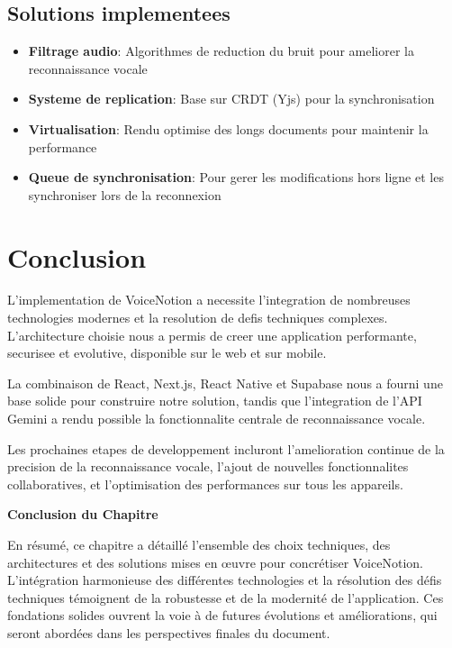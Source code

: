 \subsection{Solutions implementees}
\begin{itemize}
    \item \textbf{Filtrage audio}: Algorithmes de reduction du bruit pour ameliorer la reconnaissance vocale
    \item \textbf{Systeme de replication}: Base sur CRDT (Yjs) pour la synchronisation
    \item \textbf{Virtualisation}: Rendu optimise des longs documents pour maintenir la performance
    \item \textbf{Queue de synchronisation}: Pour gerer les modifications hors ligne et les synchroniser lors de la reconnexion
\end{itemize}



\section{Conclusion}
L'implementation de VoiceNotion a necessite l'integration de nombreuses technologies modernes et la resolution de defis techniques complexes. L'architecture choisie nous a permis de creer une application performante, securisee et evolutive, disponible sur le web et sur mobile.

La combinaison de React, Next.js, React Native et Supabase nous a fourni une base solide pour construire notre solution, tandis que l'integration de l'API Gemini a rendu possible la fonctionnalite centrale de reconnaissance vocale.

Les prochaines etapes de developpement incluront l'amelioration continue de la precision de la reconnaissance vocale, l'ajout de nouvelles fonctionnalites collaboratives, et l'optimisation des performances sur tous les appareils. 

\vspace{1cm}
\begin{center}
\textbf{\large Conclusion du Chapitre}
\end{center}

\noindent
En résumé, ce chapitre a détaillé l'ensemble des choix techniques, des architectures et des solutions mises en œuvre pour concrétiser VoiceNotion. L'intégration harmonieuse des différentes technologies et la résolution des défis techniques témoignent de la robustesse et de la modernité de l'application. Ces fondations solides ouvrent la voie à de futures évolutions et améliorations, qui seront abordées dans les perspectives finales du document.